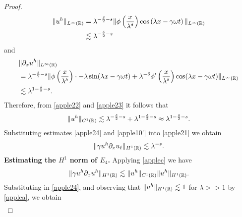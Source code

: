\begin{proof}
\begin{equation}
	\begin{split}
		\|u^h\|_{L^\infty(\mathbb{R})} 
		& = \lambda^{-\frac{\delta}{2} -s } \|\phi\left( \frac{x}{\lambda^\delta}
		\right) \cos \left( \lambda x - \gamma \omega t \right) \|_{L^\infty(\mathbb{R})}
		\\
		& \lesssim \lambda^{-\frac{\delta}{2} -s }
		\label{apple22}
	\end{split}
\end{equation}
and 
\begin{equation}
	\begin{split}
		& \|\partial_x u^h \|_{L^\infty(\mathbb{R})}
		\\
		& = \lambda^{-\frac{\delta}{2}-s} \|\phi\left(
		\frac{x}{\lambda^\delta}
		\right) \cdot -\lambda \sin(\lambda x - \gamma \omega t) + \lambda^{-\delta}
		\phi'\left( \frac{x}{\lambda^\delta}\right) \cos(\lambda x - \gamma \omega
		t) \|_{L^\infty(\mathbb{R})}
		\\
		& \lesssim \lambda^{1 - \frac{\delta}{2} -s }.
		\label{apple23}
	\end{split}
\end{equation}
Therefore, from \eqref{apple22} and \eqref{apple23} it follows that
\begin{equation}
	\begin{split}
		\|u^h\|_{C^1(\mathbb{R})} \lesssim \lambda^{-\frac{\delta}{2} -s } + \lambda^{1
		-\frac{\delta}{2} -s}
		\approx \lambda^{1- \frac{\delta}{2} -s}.
		\label{apple24}
	\end{split}
\end{equation}
Substituting estimates \eqref{apple24} and  \eqref{apple10'} into \eqref{apple21} we obtain
\begin{equation}
	\begin{split}
		\|\gamma u^h \partial_x u_\ell \|_{H^1(\mathbb{R})} \lesssim \lambda^{-s}.
		\label{apple24'}
	\end{split}
\end{equation}
%
{\bf Estimating the $H^1$ norm of $\hyperref[all_errors_together]{E_4}$.} Applying  \eqref{applec} we have
\begin{equation}
	\begin{split}
		\|\gamma u^h \partial_x u^h\|_{H^1(\mathbb{R})} \lesssim \|u^h\|_{C^1(\mathbb{R})}
		\|u^h\|_{H^1(\mathbb{R})}.
		\label{apple25}
	\end{split}
\end{equation}
Substituting in \eqref{apple24}, and observing that $\|u^h\|_{H^1(\mathbb{R})} \lesssim 1$ for $\lambda >>1$ by 
\cref{applea}, we obtain
\begin{equation}
	\begin{split}

\end{split}
\end{equation}
\end{proof}
